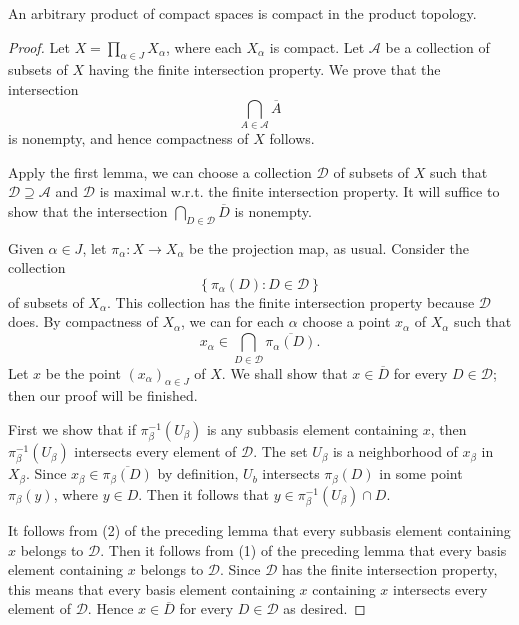 \begin{theorem}
  An arbitrary product of compact spaces is compact in the product topology.
\end{theorem}
\begin{proof}
  Let \( X = \prod_{\alpha \in J} X_\alpha \), where each \( X_\alpha \) is compact.
  Let \( \mathcal{A} \) be a collection of subsets of \( X \) having the finite intersection property.
  We prove that the intersection
  \[
    \bigcap_{A \in \mathcal{A}} \overline{A}
  \]
  is nonempty, and hence compactness of \( X \) follows.

  Apply the first lemma, we can choose a collection \( \mathcal{D} \) of subsets of \( X \) such that \( \mathcal{D} \supseteq \mathcal{A} \) and \( \mathcal{D} \) is maximal w.r.t. the finite intersection property.
  It will suffice to show that the intersection \( \bigcap_{D \in \mathcal{D}} \overline{D} \) is nonempty.

  Given \( \alpha \in J \), let \( \pi_\alpha: X \to X_\alpha \) be the projection map, as usual.
  Consider the collection
  \[
    \left\lbrace \pi_\alpha(D): D \in \mathcal{D} \right\rbrace
  \]
  of subsets of \( X_\alpha \).
  This collection has the finite intersection property because \( \mathcal{D} \) does.
  By compactness of \( X_\alpha \), we can for each \( \alpha \) choose a point \( x_\alpha \) of \( X_\alpha \) such that
  \[
    x_\alpha \in \bigcap_{D \in \mathcal{D}} \overline{\pi_\alpha(D)}.
  \]
  Let \( x \) be the point \( (x_\alpha)_{\alpha \in J} \) of \( X \).
  We shall show that \( x \in \overline{D} \) for every \( D \in \mathcal{D} \); then our proof will be finished.

  First we show that if \( \pi_\beta^{-1}(U_\beta) \) is any subbasis element containing \( x \), then \( \pi_\beta^{-1}(U_\beta) \) intersects every element of \( \mathcal{D} \).
  The set \( U_\beta \) is a neighborhood of \( x_\beta \) in \( X_\beta \).
  Since \( x_\beta \in \overline{\pi_\beta(D)} \) by definition, \( U_b \) intersects \( \pi_\beta(D) \) in some point \( \pi_\beta(y) \), where \( y \in D \).
  Then it follows that \( y \in \pi^{-1}_\beta(U_\beta) \cap D \).

  It follows from (2) of the preceding lemma that every subbasis element containing \( x \) belongs to \( \mathcal{D} \).
  Then it follows from (1) of the preceding lemma that every basis element containing \( x \) belongs to \( \mathcal{D} \).
  Since \( \mathcal{D} \) has the finite intersection property, this means that every basis element containing \( x \) containing \( x \) intersects every element of \( \mathcal{D} \).
  Hence \( x \in \overline{D} \) for every \( D \in \mathcal{D} \) as desired.
\end{proof}


